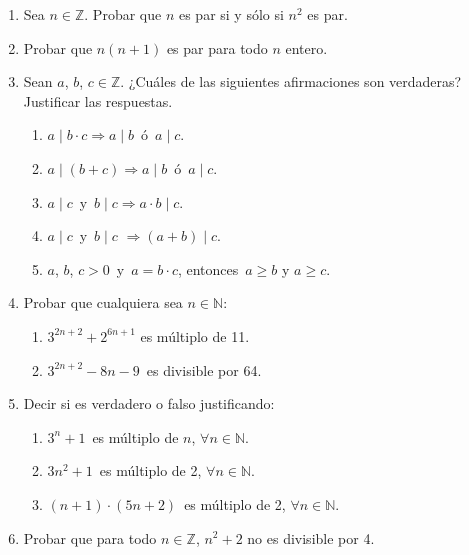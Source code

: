 \documentclass[12pt,spanish,makeidx]{amsbook}
\begin{document}
\begin{enumerate}
\smallskip

\item Sea $n\in \mathbb Z$. Probar que $n$ es par si y sólo si $n^2$ es par.

\smallskip

\item Probar que $n(n+1)$ es par para todo $n$ entero.

\smallskip

\item Sean $a$, $b$, $c \in {\mathbb Z}$. ¿Cuáles de las siguientes afirmaciones son verdaderas? Justificar las respuestas.
  \begin{enumerate}
  \item $a \mid b\cdot c \Rightarrow a \mid b$\, ó \,$a \mid c$.
  \item $a \mid (b+c) \Rightarrow a\mid b$\, ó \,$a \mid c$.
  \item $a \mid c$\, y \,$b \mid c \Rightarrow a\cdot b \mid c$.
  \item $a \mid c$\, y \,$b \mid c$ $\Rightarrow (a +b) \mid c$.
  \item $a$, $b$, $c>0$\, y \,$a=b\cdot c$, entonces\, $a \ge b$ y $a \ge c$.
  \end{enumerate}


\smallskip

\item Probar que cualquiera sea $n \in {\mathbb N}$:
  \begin{enumerate}
  \item $3^{2n+2}+ 2^{6n+1}$ es múltiplo de 11.
  \item $3^{2n+2} - 8n - 9$\, es divisible por 64.
  \end{enumerate}

\smallskip

\item Decir si es verdadero o falso justificando:
  \begin{enumerate}
  \item $3^n+1$\, es múltiplo de $n$, $\forall n \in {\mathbb N}$.
  \item $3n^2+1$\, es múltiplo de 2, $\forall n \in {\mathbb N}$.
  \item $(n+1)\cdot (5n+2)$\, es múltiplo de 2, $\forall n \in {\mathbb N}$.
  \end{enumerate}

\smallskip

\item Probar que para todo $n \in {\mathbb Z}$, $n^2 + 2$ no es divisible por 4.



\end{enumerate}
\end{document}

